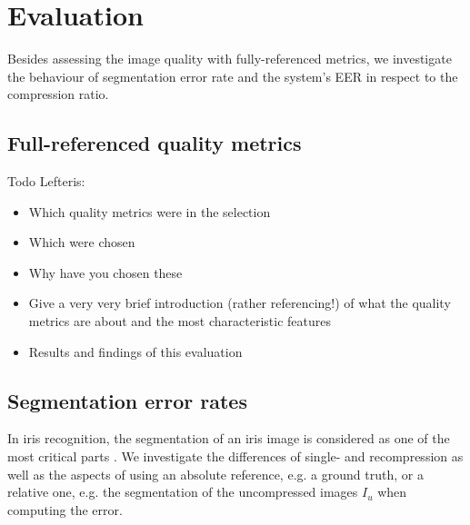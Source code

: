 \documentclass[10pt,twocolumn,letterpaper]{article}
\begin{document}
\section{Evaluation}
\label{section:eval}
 Besides assessing the image quality with fully-referenced metrics, we investigate the behaviour of segmentation error rate and the system's EER in respect to the compression ratio.


\subsection{Full-referenced quality metrics}
Todo Lefteris:
\begin{itemize}
 \item Which quality metrics were in the selection
 \item Which were chosen
 \item Why have you chosen these
 \item Give a very very brief introduction (rather referencing!) of what the quality metrics are about and the most characteristic features
 \item Results and findings of this evaluation
\end{itemize}

\subsection{Segmentation error rates}
\label{section:ser}
In iris recognition, the segmentation of an iris image is considered as one of the most critical parts \cite{BDaugman08a, severeCompression}. We investigate the differences of single- and recompression as well as the aspects of using an absolute reference, e.g. a ground truth, or a relative one, e.g. the segmentation of the uncompressed images $I_u$ when computing the error.
\end{document}
